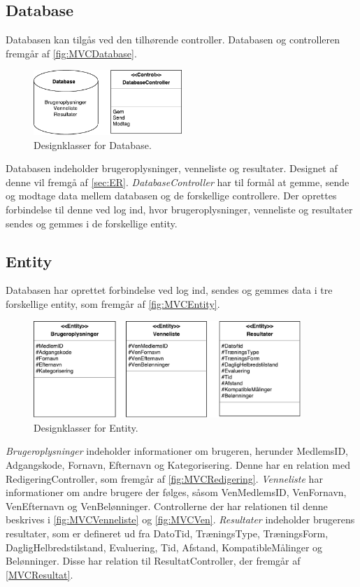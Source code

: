 \subsection*{Database}
Databasen kan tilgås ved den tilhørende controller. Databasen og controlleren fremgår af \autoref{fig:MVCDatabase}. 

\begin{figure} [H]
\centering
\includegraphics[width=0.5\textwidth]{figures/MVC/MVCDatabase}
\caption{Designklasser for Database.}
\label{fig:MVCDatabase}
\end{figure}

\noindent
Databasen indeholder brugeroplysninger, venneliste og resultater. Designet af denne vil fremgå af \autoref{sec:ER}. \textit{DatabaseController} har til formål at gemme, sende og modtage data mellem databasen og de forskellige controllere. Der oprettes forbindelse til denne ved log ind, hvor brugeroplysninger, venneliste og resultater sendes og gemmes i de forskellige entity. 


\subsection*{Entity}  \label{sec:entity}
Databasen har oprettet forbindelse ved log ind, sendes og gemmes data i tre forskellige entity, som fremgår af \autoref{fig:MVCEntity}. 

\begin{figure} [H]
\centering
\includegraphics[width=0.9\textwidth]{figures/MVC/Entity}
\caption{Designklasser for Entity.}
\label{fig:MVCEntity}
\end{figure}

\noindent
\textit{Brugeroplysninger} indeholder informationer om brugeren, herunder MedlemsID, Adgangskode, Fornavn, Efternavn og Kategorisering. Denne har en relation med RedigeringController, som fremgår af \autoref{fig:MVCRedigering}. 
\textit{Venneliste} har informationer om andre brugere der følges, såsom VenMedlemsID, VenFornavn, VenEfternavn og VenBelønninger. Controllerne der har relationen til denne beskrives i \autoref{fig:MVCVenneliste} og  \autoref{fig:MVCVen}.
\textit{Resultater} indeholder brugerens resultater, som er defineret ud fra DatoTid, TræningsType, TræningsForm, DagligHelbredstilstand, Evaluering, Tid, Afstand, KompatibleMålinger og Belønninger. Disse har relation til ResultatController, der fremgår af  \autoref{MVCResultat}.

